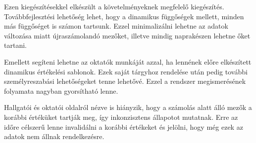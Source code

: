 Ezen kiegészítésekkel elkészült a követelményeknek megfelelő kiegészítés. Továbbfejlesztési lehetőség lehet, hogy a dinamikus függőségek mellett, minden más függőséget is számon tartsunk. Ezzel minimalizálni lehetne az adatok változása miatt újraszámolandó mezőket, illetve mindig naprakészen lehetne őket tartani.

Emellett segíteni lehetne az oktatók munkáját azzal, ha lennének előre elkészített dinamikus értékelési sablonok. Ezek saját tárgyhoz rendelése után pedig további személyreszabási lehetőségeket tenne lehetővé. Ezzel a rendszer megismerésének folyamata nagyban gyorsítható lenne.

Hallgatói és oktatói oldalról nézve is hiányzik, hogy a számolás alatt álló mezők a korábbi értéküket tartják meg, így inkonzisztens állapotot mutatnak. Erre az időre célszerű lenne invalidálni a korábbi értékeket és jelölni, hogy még ezek az adatok nem állnak rendelkezésre.